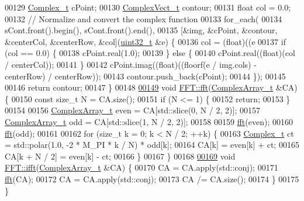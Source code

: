 \begin{DoxyCode}
00129   \hyperlink{_soil_math_types_8h_a26c307796ad803485b0376c90026d8f7}{Complex\_t} cPoint;
00130   \hyperlink{_soil_math_types_8h_a7567e521c2b2c408dcb62dbff72390f7}{ComplexVect\_t} contour;
00131   \textcolor{keywordtype}{float} col = 0.0;
00132   \textcolor{comment}{// Normalize and convert the complex function}
00133   for\_each(
00134       sCont.front().begin(), sCont.front().end(),
00135       [&img, &cPoint, &contour, &centerCol, &centerRow, &col](\hyperlink{_soil_math_types_8h_a435d1572bf3f880d55459d9805097f62}{uint32\_t} &e) \{
00136         col = (float)((e %
00137         \textcolor{keywordflow}{if} (col == 0.0) \{
00138           cPoint.real(1.0);
00139         \} \textcolor{keywordflow}{else} \{
00140           cPoint.real((\textcolor{keywordtype}{float})(col / centerCol));
00141         \}
00142         cPoint.imag((\textcolor{keywordtype}{float})((floorf(e / img.cols) - centerRow) / centerRow));
00143         contour.push\_back(cPoint);
00144       \});
00145 
00146   \textcolor{keywordflow}{return} contour;
00147 \}
00148 
\hypertarget{_f_f_t_8cpp_source_l00149}{}\hyperlink{class_soil_math_1_1_f_f_t_a48bc7ad948d820d6f87b3e353b6d1cd4}{00149} \textcolor{keywordtype}{void} \hyperlink{class_soil_math_1_1_f_f_t_a48bc7ad948d820d6f87b3e353b6d1cd4}{FFT::fft}(\hyperlink{_soil_math_types_8h_a5118c9f6b02a06945c93a3893e51febe}{ComplexArray\_t} &CA) \{
00150   \textcolor{keyword}{const} \textcolor{keywordtype}{size\_t} N = CA.size();
00151   \textcolor{keywordflow}{if} (N <= 1) \{
00152     \textcolor{keywordflow}{return};
00153   \}
00154 
00156   \hyperlink{_soil_math_types_8h_a5118c9f6b02a06945c93a3893e51febe}{ComplexArray\_t} even = CA[std::slice(0, N / 2, 2)];
00157   \hyperlink{_soil_math_types_8h_a5118c9f6b02a06945c93a3893e51febe}{ComplexArray\_t} odd = CA[std::slice(1, N / 2, 2)];
00158 
00159   \hyperlink{class_soil_math_1_1_f_f_t_a48bc7ad948d820d6f87b3e353b6d1cd4}{fft}(even);
00160   \hyperlink{class_soil_math_1_1_f_f_t_a48bc7ad948d820d6f87b3e353b6d1cd4}{fft}(odd);
00161 
00162   \textcolor{keywordflow}{for} (\textcolor{keywordtype}{size\_t} k = 0; k < N / 2; ++k) \{
00163     \hyperlink{_soil_math_types_8h_a26c307796ad803485b0376c90026d8f7}{Complex\_t} ct = std::polar(1.0, -2 * M\_PI * k / N) * odd[k];
00164     CA[k] = even[k] + ct;
00165     CA[k + N / 2] = even[k] - ct;
00166   \}
00167 \}
00168 
\hypertarget{_f_f_t_8cpp_source_l00169}{}\hyperlink{class_soil_math_1_1_f_f_t_a5b7f18d1cb2d728584414d8660d52586}{00169} \textcolor{keywordtype}{void} \hyperlink{class_soil_math_1_1_f_f_t_a5b7f18d1cb2d728584414d8660d52586}{FFT::ifft}(\hyperlink{_soil_math_types_8h_a5118c9f6b02a06945c93a3893e51febe}{ComplexArray\_t} &CA) \{
00170   CA = CA.apply(std::conj);
00171   \hyperlink{class_soil_math_1_1_f_f_t_a48bc7ad948d820d6f87b3e353b6d1cd4}{fft}(CA);
00172   CA = CA.apply(std::conj);
00173   CA /= CA.size();
00174 \}
00175 \}
\end{DoxyCode}
